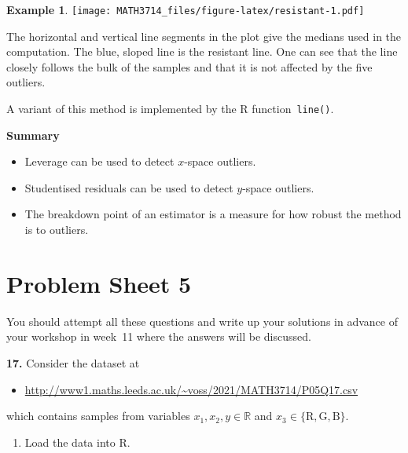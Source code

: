 \documentclass[
  a4paper,
]{article}
\providecommand{\tightlist}{%
  \setlength{\itemsep}{0pt}\setlength{\parskip}{0pt}}
\theoremstyle{definition}
\theoremstyle{definition}
\newtheorem{example}{Example}[section]
\theoremstyle{definition}
\theoremstyle{definition}
\theoremstyle{remark}
\begin{document}
\begin{example}
\texttt{[image: MATH3714\_files/figure-latex/resistant-1.pdf]}

The horizontal and vertical line segments in the plot give the medians
used in the computation. The blue, sloped line is the resistant line.
One can see that the line closely follows the bulk of the samples
and that it is not affected by the five outliers.

A variant of this method is implemented by the R function~\texttt{line()}.
\end{example}

\textbf{Summary}

\begin{itemize}
\tightlist
\item
  Leverage can be used to detect \(x\)-space outliers.
\item
  Studentised residuals can be used to detect \(y\)-space outliers.
\item
  The breakdown point of an estimator is a measure for how robust
  the method is to outliers.
\end{itemize}

\clearpage

\hypertarget{P05}{%
\section*{Problem Sheet 5}\label{P05}}

You should attempt all these questions and write up your solutions in advance
of your workshop in week~11 where the answers will be discussed.

\textbf{17.} Consider the dataset at

\begin{itemize}
\tightlist
\item
  \url{http://www1.maths.leeds.ac.uk/~voss/2021/MATH3714/P05Q17.csv}
\end{itemize}

which contains samples from variables \(x_1, x_2, y \in \mathbb{R}\) and
\(x_3 \in \{\mathrm{R}, \mathrm{G}, \mathrm{B}\}\).

\begin{enumerate}
\def\labelenumi{\alph{enumi}.}
\tightlist
\item
  Load the data into R.
\end{enumerate}
\end{document}
